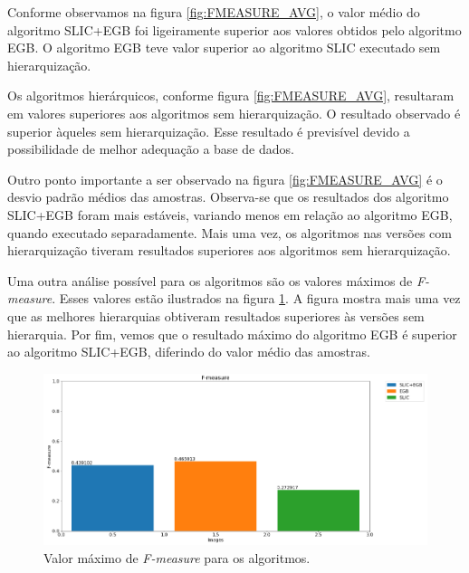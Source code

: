 \begin{document}
Conforme observamos na figura \ref{fig:FMEASURE_AVG}, o valor médio do algoritmo SLIC+EGB foi ligeiramente superior aos valores obtidos pelo algoritmo EGB. O algoritmo EGB teve valor superior ao algoritmo SLIC executado sem hierarquização. 

Os algoritmos hierárquicos, conforme figura \ref{fig:FMEASURE_AVG}, resultaram em valores superiores aos algoritmos sem hierarquização. O resultado observado é superior àqueles sem hierarquização. Esse resultado é previsível devido a possibilidade de melhor adequação a base de dados.

Outro ponto importante a ser observado na figura \ref{fig:FMEASURE_AVG} é o desvio padrão médios das amostras. Observa-se que os resultados dos algoritmo SLIC+EGB foram mais estáveis, variando menos em relação ao algoritmo EGB, quando executado separadamente. Mais uma vez, os algoritmos nas versões com hierarquização tiveram resultados superiores aos algoritmos sem hierarquização.

Uma outra análise possível para os algoritmos são os valores máximos de \textit{F-measure}. Esses valores estão ilustrados na figura \ref{fig:FMEASURE_MAX}. A figura mostra mais uma vez que as melhores hierarquias obtiveram resultados superiores às versões sem hierarquia. Por fim, vemos que o resultado máximo do algoritmo EGB é superior ao algoritmo SLIC+EGB, diferindo do valor médio das amostras.

\begin{figure}[ht]
\centering
\includegraphics[width=1.\textwidth]{fmeasure_max.png}
\caption{Valor máximo de \textit{F-measure} para os algoritmos.}
\label{fig:FMEASURE_MAX}
\end{figure}


\end{document}
